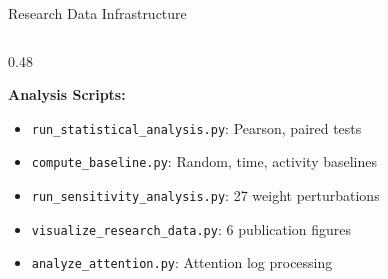 \documentclass[aspectratio=169,10pt]{beamer}
\begin{document}
\begin{frame}{Research Data Infrastructure}
\begin{columns}[T]
\begin{column}{0.48\textwidth}
\begin{center}
\end{center}

\vspace{6pt}
\footnotesize
\textbf{Analysis Scripts:}
\begin{itemize}\scriptsize
  \item \texttt{run\_statistical\_analysis.py}: Pearson, paired tests
  \item \texttt{compute\_baseline.py}: Random, time, activity baselines
  \item \texttt{run\_sensitivity\_analysis.py}: 27 weight perturbations
  \item \texttt{visualize\_research\_data.py}: 6 publication figures
  \item \texttt{analyze\_attention.py}: Attention log processing
\end{itemize}
\end{column}
\end{columns}
\end{frame}
\end{document}
